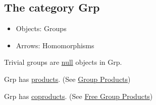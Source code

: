 \subsection{The category Grp}
\begin{itemize}
  \item Objects: Groups
  \item Arrows: Homomorphisms
\end{itemize}

\begin{proposition}
Trivial groups are \hyperref[null]{null} objects in Grp.
\end{proposition}

\begin{proposition}
Grp has \hyperref[products]{products}. (See \hyperref[groupproduct]{Group Products})
\end{proposition}

\begin{proposition}
Grp has \hyperref[coproducts]{coproducts}. (See \hyperref[freegroupproduct]{Free Group Products})
\end{proposition}